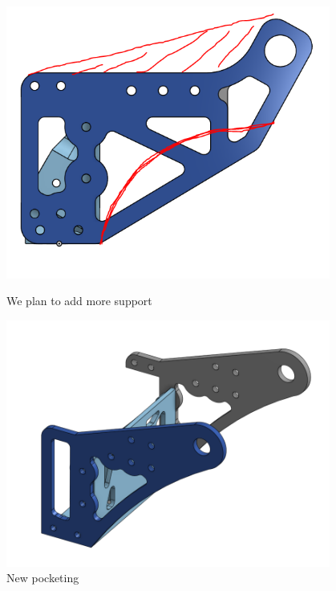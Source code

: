 \begin{figure}[ht]
\centering
\begin{minipage}[b]{.48\textwidth}
  \centering
  \includegraphics[width=0.95\textwidth]{Meetings/January/01-12-22/1-12-22_Hardware_Figure1 - Nathan Forrer.PNG}
  \caption{We plan to add more support}
  \label{fig:011222_2}
\end{minipage}%
\hfill%
\begin{minipage}[b]{.48\textwidth}
  \centering
  \includegraphics[width=0.95\textwidth]{Meetings/January/01-12-22/1-12-22_Hardware_Figure2 - Nathan Forrer.PNG}
  \caption{New pocketing}
  \label{fig:011222_3}
\end{minipage}
\end{figure}



